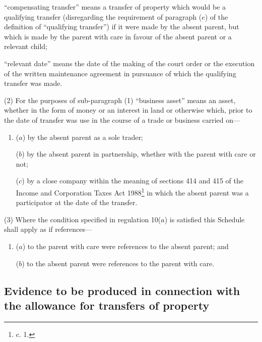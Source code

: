 \documentclass[a4paper]{article}
\begin{document}
\begin{enumerate}
“compensating transfer” means a transfer of property which would be a qualifying transfer (disregarding the requirement of paragraph ($e$) of the definition of “qualifying transfer”) if it were made by the absent parent, but which is made by the parent with care in favour of the absent parent or a relevant child;

“relevant date” means the date of the making of the court order or the execution of the written maintenance agreement in pursuance of which the qualifying transfer was made.
\end{enumerate}

(2) For the purposes of sub-paragraph (1) “business asset” means an asset, whether in the form of money or an interest in land or otherwise which, prior to the date of transfer was use in the course of a trade or business carried on—
\begin{enumerate}\item[]
($a$) by the absent parent as a sole trader;

($b$) by the absent parent in partnership, whether with the parent with care or not;

($c$) by a close company within the meaning of sections 414 and 415 of the Income and Corporation Taxes Act 1988\footnote{ c. 1.} in which the absent parent was a participator at the date of the transfer.
\end{enumerate}

(3) Where the condition specified in regulation 10($a$) is satisfied this Schedule shall apply as if references—
\begin{enumerate}\item[]
($a$) to the parent with care were references to the absent parent; and

($b$) to the absent parent were references to the parent with care.
\end{enumerate}

\subsection*{Evidence to be produced in connection with the allowance for transfers of property}
\end{document}

